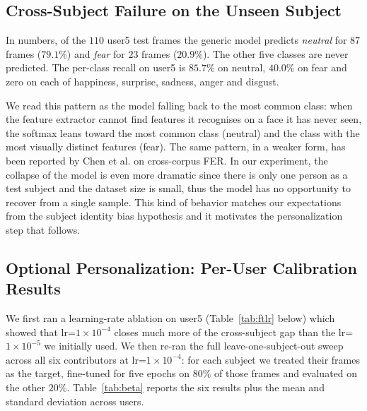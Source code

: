 \documentclass[12pt,a4paper]{article}
\begin{document}
\subsection{Cross-Subject Failure on the Unseen Subject}
\label{sec:results:failure}

In numbers, of the $110$ user5 test frames the generic model
predicts \emph{neutral} for $87$ frames ($79.1\%$) and
\emph{fear} for $23$ frames ($20.9\%$). The other five classes
are never predicted. The per-class recall on user5 is
$85.7\%$ on neutral, $40.0\%$ on fear and zero on each of
happiness, surprise, sadness, anger and disgust.

We read this pattern as the model falling back to the most
common class: when the feature extractor cannot find features
it recognises on a face it has never seen, the softmax leans
toward the most common class (neutral) and the class with the
most visually distinct features (fear). The same pattern, in a
weaker form, has been reported by Chen et al.
\autocite{chen2021agra} on cross-corpus FER. In our experiment,
the collapse of the model is even more dramatic since there is
only one person as a test subject and the dataset size is small,
thus the model has no opportunity to recover from a single
sample. This kind of behavior matches our expectations from the
subject identity bias hypothesis and it
motivates the personalization step that follows.

\subsection{Optional Personalization: Per-User Calibration Results}
\label{sec:results:personalize}

We first ran a learning-rate ablation on user5
(Table~\ref{tab:ftlr} below) which showed that
lr=$1\times 10^{-4}$ closes much more of the cross-subject
gap than the lr=$1\times 10^{-5}$ we initially used. We then
re-ran the full leave-one-subject-out sweep across all six
contributors at lr=$1\times 10^{-4}$: for each subject we
treated their frames as the target, fine-tuned for five
epochs on $80\%$ of those frames and evaluated on the other
$20\%$. Table~\ref{tab:beta} reports the six results plus
the mean and standard deviation across users.
\end{document}

